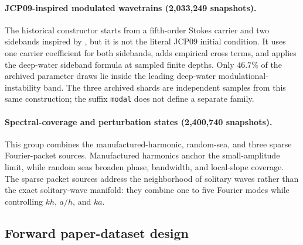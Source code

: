 \paragraph{JCP09-inspired modulated wavetrains (2,033,249 snapshots).}
The historical constructor starts from a fifth-order Stokes carrier and two
sidebands inspired by \cite{xu2009}, but it is not the literal JCP09 initial
condition.  It uses one carrier coefficient for both sidebands, adds empirical
cross terms, and applies the deep-water sideband formula at sampled finite
depths.  Only \(46.7\%\) of the archived parameter draws lie inside the
leading deep-water modulational-instability band.  The three archived shards
are independent samples from this same construction; the suffix
\texttt{modal} does not define a separate family.

\paragraph{Spectral-coverage and perturbation states (2,400,740 snapshots).}
This group combines the manufactured-harmonic, random-sea, and three sparse
Fourier-packet sources.  Manufactured harmonics anchor the small-amplitude
limit, while random seas broaden phase, bandwidth, and local-slope coverage.
The sparse packet sources address the
neighborhood of solitary waves rather than the exact solitary-wave manifold:
they combine one to five Fourier modes while controlling $kh$, $a/h$, and
$ka$.

\subsection{Forward paper-dataset design}

